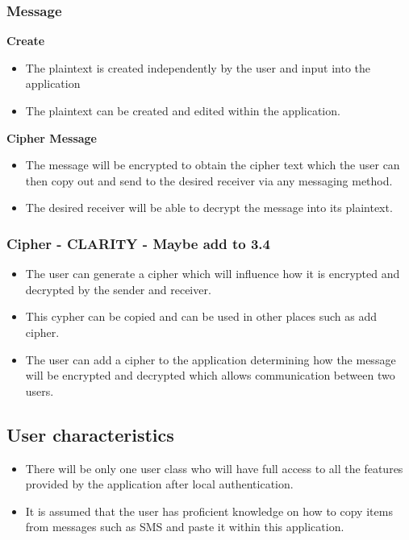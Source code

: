 \subsubsection{Message}
\textbf{Create}
\begin{itemize}
\item The plaintext is created independently by the user and input into the application
\item The plaintext can be created and edited within the application.
\end{itemize}
\textbf{Cipher Message}
\begin{itemize}
\item The message will be encrypted to obtain the cipher text which the user can then copy out and send to the desired receiver via any messaging method.
\item The desired receiver will be able to decrypt the message into its plaintext.
\end{itemize}


\subsubsection{Cipher - CLARITY - Maybe add to 3.4}
\begin{itemize}
\item The user can generate a cipher which will influence how it is encrypted and decrypted by the sender and receiver. 
\item This cypher can be copied and can be used in other places such as add cipher.
\item The user can add a cipher to the application determining how the message will be encrypted and decrypted which allows communication between two users.
\end{itemize}

\subsection{User characteristics}
\begin{itemize}
\item There will be only one user class who will have full access to all the features provided by the application after local authentication.
\item It is assumed that the user has proficient knowledge on how to copy items from messages such as SMS and paste it within this application.
\end{itemize}



